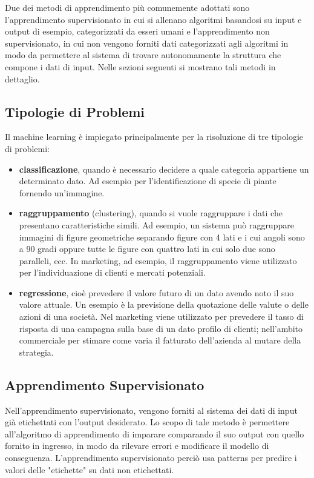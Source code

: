 Due dei metodi di apprendimento più comunemente adottati sono l'apprendimento supervisionato in cui si allenano algoritmi basandosi su input e output di esempio, categorizzati da esseri umani e l'apprendimento non supervisionato, in cui non vengono forniti dati categorizzati agli algoritmi in modo da permettere al sistema di trovare autonomamente la struttura che compone i dati di input. Nelle sezioni seguenti si mostrano tali metodi in dettaglio.

\subsection{Tipologie di Problemi}
Il machine learning è impiegato principalmente per la risoluzione di tre tipologie di problemi:
\begin{itemize}
\item \textbf{classificazione}, quando è necessario decidere a quale categoria appartiene un determinato dato. Ad esempio per l'identificazione di specie di piante fornendo un'immagine.
\item \textbf{raggruppamento} (clustering), quando si vuole raggruppare i dati che presentano caratteristiche simili. Ad esempio, un sistema può raggruppare immagini di figure geometriche separando figure con 4 lati e i cui angoli sono a 90 gradi oppure tutte le figure con quattro lati in cui solo due sono paralleli, ecc. In marketing, ad esempio, il raggruppamento viene utilizzato per l'individuazione di clienti e mercati potenziali.
\item \textbf{regressione}, cioè prevedere il valore futuro di un dato avendo noto il suo valore attuale. Un esempio è la previsione della quotazione delle valute o delle azioni di una società. Nel marketing viene utilizzato per prevedere il tasso di risposta di una campagna sulla base di un dato profilo di clienti; nell’ambito commerciale per stimare come varia il fatturato dell’azienda al mutare della strategia.
\end{itemize}

\subsection{Apprendimento Supervisionato}
Nell'apprendimento supervisionato, vengono forniti al sistema dei dati di input già etichettati con l'output desiderato. Lo scopo di tale metodo è permettere all'algoritmo di apprendimento di imparare comparando il suo output con quello fornito in ingresso, in modo da rilevare errori e modificare il modello di conseguenza. L'apprendimento supervisionato perciò usa patterns per predire i valori delle "etichette" su dati non etichettati.

